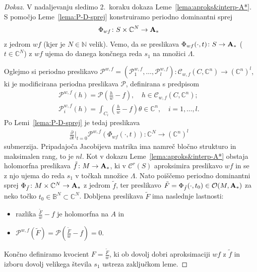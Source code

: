 \documentclass[12pt,a4paper,twoside]{article}
\theoremstyle{definition} %
\newenvironment{dokaz}[1][Dokaz]{\begin{proof}[#1]}{\end{proof}}
\theoremstyle{plain} %
\numberwithin{equation}{section}  %
\newcommand{\C}{\mathbb C}
\begin{document}
\begin{dokaz}
V nadaljevanju sledimo 2.~koraku dokaza Leme~\ref{lema:aproks&interp-A*}. S pomočjo Leme~\ref{lema:P-D-sprej} konstruiramo periodno dominantni sprej
\begin{gather*}
\Phi_{wf} \colon S \times \mathbb{C}^{N} \to \textup{\textbf{A}}_{*}
\end{gather*}
z jedrom $wf$ (kjer je $N \in \mathbb{N}$ velik). Vemo, da se preslikava $\Phi_{wf}(\cdot,t) \colon S \to \textup{\textbf{A}}_{*}$ ($t \in \mathbb{C}^{N}$) z $wf$ ujema do danega končnega reda $s_1$ na množici $\Lambda$.

Oglejmo si periodno preslikavo 
$\mathcal{P}^{w,f} = (\mathcal{P}_{1}^{w,f}, \dots , \mathcal{P}_{l}^{w,f}) \colon \mathcal{C}_{w,f}(C, \mathbb{C}^{n}) \to (\mathbb{C}^{n})^{l}$,
ki je modificirana periodna preslikava $\mathcal{P}$, definirana s predpisom
\begin{gather*}
\mathcal{P}^{w,f}(h) = \mathcal{P} \left(\frac{h}{w}-f \right), \quad h \in \mathcal{C}_{w,f}(C, \mathbb{C}^{n}); \\
\mathcal{P}_{i}^{w,f}(h) = \int_{C_{i}} \left( \frac{h}{w}-f \right) \theta \in \mathbb{C}^{n}, \quad i = 1, \dots , l.
\end{gather*}
Po Lemi~\ref{lema:P-D-sprej} je tedaj preslikava 
\begin{gather*}
 \frac{\partial}{\partial t} \Big|_{t=0} \mathcal{P}^{w,f}(\Phi_{wf}(\cdot, t)) \colon \C^{N} \to (\C^{n})^{l}
\end{gather*}
submerzija. Pripadajoča Jacobijeva matrika ima namreč bločno strukturo in maksimalen rang, to je $nl$.
Kot v dokazu Leme~\ref{lema:aproks&interp-A*} obstaja holomorfna preslikava $\tilde{f} \colon M \to \textup{\textbf{A}}_{*}$, ki v $\mathcal{C}^{r}(S)$ aproksimira preslikavo $wf$ in se z njo ujema do reda $s_1$ v točkah množice $\Lambda$.
Nato poiščemo periodno dominantni sprej $\Phi_{\tilde{f}} \colon M \times \C^{N} \to \textup{\textbf{A}}_{*}$ z jedrom $\tilde{f}$, ter preslikavo 
$\tilde{F} = \Phi_{\tilde{f}}(\cdot, t_0) \in \mathcal{O}(M, \textup{\textbf{A}}_{*})$ za neko točko $t_0 \in \mathbb{B}^{N} \subset \C^{N}$. 
Dobljena preslikava $\tilde{F}$ ima naslednje lastnosti:
\begin{itemize}
\item razlika $\frac{\tilde{F}}{w}-f$ je holomorfna na $A$ in
\item $\mathcal{P}^{w,f}(\tilde{F}) = \mathcal{P} \left(\frac{\tilde{F}}{w}-f \right) = 0$.
\end{itemize}
Končno definiramo kvocient $F = \frac{\tilde{F}}{w}$, ki ob dovolj dobri aproksimaciji $wf$ z $\tilde{f}$ in izboru dovolj velikega števila $s_1$ ustreza zaključkom leme.
\end{dokaz}
\end{document}
